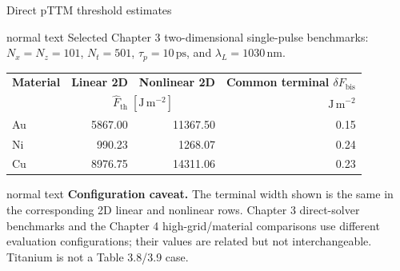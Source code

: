 \documentclass[aspectratio=169,10pt]{beamer}
\begin{document}
\begin{frame}[t]{Direct pTTM threshold estimates}
  \hypertarget{supp:threshold-direct-results}{}
  \vspace{-0.18cm}\hfill
  \hspace{0.10cm}\GVBackupIndexButton
  \vspace{0.12cm}
  \begin{center}
    \begin{beamercolorbox}[wd=0.92\textwidth,sep=0.52em,center]{normal text}
      \small\color{GVSlate}
      Selected Chapter 3 two-dimensional single-pulse benchmarks: \(N_x=N_z=101\), \(N_t=501\), \(\tau_p=10\,\mathrm{ps}\), and \(\lambda_L=1030\,\mathrm{nm}\).
    \end{beamercolorbox}
  \end{center}
  \vspace{0.12cm}
  \begin{center}
    \small
    \renewcommand{\arraystretch}{1.36}
    \begin{tabular}{@{}lrrr@{}}
      \rowcolor{GVTealTint}
      \textbf{Material} & \textbf{Linear 2D} & \textbf{Nonlinear 2D} & \textbf{Common terminal \(\delta F_{\mathrm{bis}}\)} \\
      & \multicolumn{2}{c}{\(\hat F_{\mathrm{th}}\;[\mathrm{J\,m^{-2}}]\)} & \(\mathrm{J\,m^{-2}}\) \\
      \hline
      Au & 5867.00 & 11367.50 & 0.15 \\
      Ni & 990.23 & 1268.07 & 0.24 \\
      Cu & 8976.75 & 14311.06 & 0.23 \\
    \end{tabular}
  \end{center}
  \vspace{0.01cm}
  \begin{beamercolorbox}[wd=0.92\textwidth,sep=0.43em]{normal text}
    \scriptsize
    \textbf{\color{GVTitleRed}Configuration caveat.} The terminal width shown is the same in the corresponding 2D linear and nonlinear rows. Chapter 3 direct-solver benchmarks and the Chapter 4 high-grid/material comparisons use different evaluation configurations; their values are related but not interchangeable. Titanium is not a Table 3.8/3.9 case.
  \end{beamercolorbox}
  \vspace{-0.08cm}
\end{frame}
\end{document}
